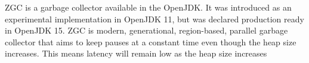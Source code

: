 ZGC is a garbage collector available in the OpenJDK. It was introduced as an experimental implementation in OpenJDK 11, but was declared production ready in OpenJDK 15. ZGC is modern, generational, region-based, parallel garbage collector that aims to keep pauses at a constant time even though the heap size increases. This means latency will remain low as the heap size increases%

